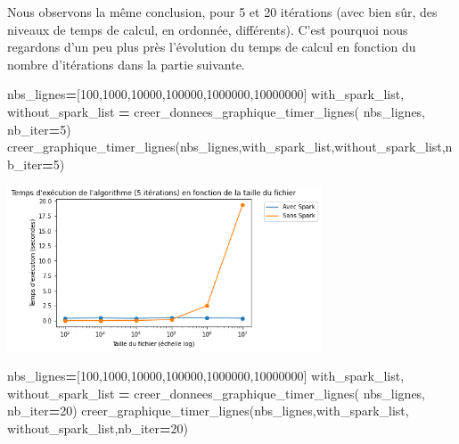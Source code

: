 \documentclass[10pt,a4paper]{article}
\newenvironment{Shaded}{\begin{snugshade}}{\end{snugshade}}
\newcommand{\DecValTok}[1]{\textcolor[rgb]{0.00,0.00,0.81}{#1}}
\newcommand{\NormalTok}[1]{#1}
\newcommand{\OperatorTok}[1]{\textcolor[rgb]{0.81,0.36,0.00}{\textbf{#1}}}
\theoremstyle{break}
\begin{document}
Nous observons la même conclusion, pour 5 et 20 itérations (avec bien sûr, des niveaux de temps de calcul, en ordonnée, différents). C'est pourquoi nous regardons d'un peu plus près l'évolution du temps de calcul en fonction du nombre d'itérations dans la partie suivante.

\begin{Shaded}
\begin{Highlighting}[]
\NormalTok{nbs_lignes}\OperatorTok{=}\NormalTok{[}\DecValTok{100}\NormalTok{,}\DecValTok{1000}\NormalTok{,}\DecValTok{10000}\NormalTok{,}\DecValTok{100000}\NormalTok{,}\DecValTok{1000000}\NormalTok{,}\DecValTok{10000000}\NormalTok{]}
\NormalTok{with_spark_list, without_spark_list }\OperatorTok{=}\NormalTok{ creer_donnees_graphique_timer_lignes(}
\NormalTok{    nbs_lignes,}
\NormalTok{    nb_iter}\OperatorTok{=}\DecValTok{5}\NormalTok{)}
\NormalTok{creer_graphique_timer_lignes(nbs_lignes,with_spark_list,without_spark_list,nb_iter}\OperatorTok{=}\DecValTok{5}\NormalTok{)}
\end{Highlighting}
\end{Shaded}

\begin{center}
\includegraphics[width=0.7\textwidth]{img/DocPageRank_files/DocPageRank_36_0.png}
\end{center}

\begin{Shaded}
\begin{Highlighting}[]
\NormalTok{nbs_lignes}\OperatorTok{=}\NormalTok{[}\DecValTok{100}\NormalTok{,}\DecValTok{1000}\NormalTok{,}\DecValTok{10000}\NormalTok{,}\DecValTok{100000}\NormalTok{,}\DecValTok{1000000}\NormalTok{,}\DecValTok{10000000}\NormalTok{]}
\NormalTok{with_spark_list, without_spark_list }\OperatorTok{=}\NormalTok{ creer_donnees_graphique_timer_lignes(}
\NormalTok{    nbs_lignes,}
\NormalTok{    nb_iter}\OperatorTok{=}\DecValTok{20}\NormalTok{)}
\NormalTok{creer_graphique_timer_lignes(nbs_lignes,with_spark_list,}
\NormalTok{                             without_spark_list,nb_iter}\OperatorTok{=}\DecValTok{20}\NormalTok{)}
\end{Highlighting}
\end{Shaded}
\end{document}
